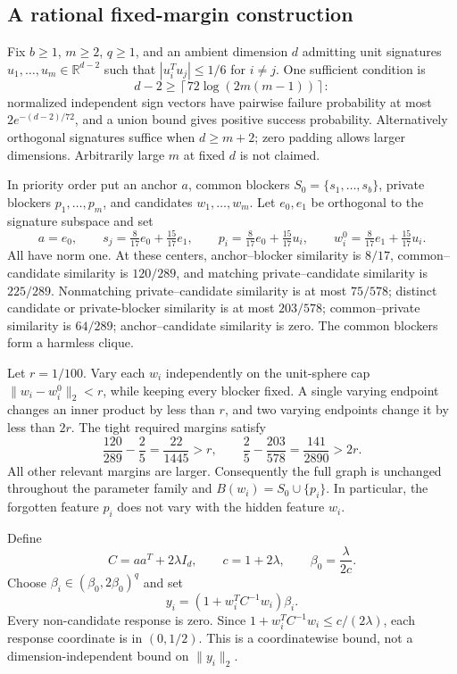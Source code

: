 \subsection{A rational fixed-margin construction}
Fix $b\ge1$, $m\ge2$, $q\ge1$, and an ambient dimension $d$ admitting unit
signatures $u_1,\ldots,u_m\in\mathbb R^{d-2}$ such that
$|u_i^Tu_j|\le1/6$ for $i\ne j$.  One sufficient condition is
\[
 d-2\ge\left\lceil72\log(2m(m-1))\right\rceil:
\]
normalized independent sign vectors have pairwise failure probability at
most $2e^{-(d-2)/72}$, and a union bound gives positive success probability.
Alternatively orthogonal signatures suffice when $d\ge m+2$; zero padding
allows larger dimensions.  Arbitrarily large $m$ at fixed $d$ is not claimed.

In priority order put an anchor $a$, common blockers
$S_0=\{s_1,\ldots,s_b\}$, private blockers $p_1,\ldots,p_m$, and candidates
$w_1,\ldots,w_m$.  Let $e_0,e_1$ be orthogonal to the signature subspace and set
\[
 a=e_0,\qquad
 s_j=\tfrac8{17}e_0+\tfrac{15}{17}e_1,\qquad
 p_i=\tfrac8{17}e_0+\tfrac{15}{17}u_i,\qquad
 w_i^0=\tfrac8{17}e_1+\tfrac{15}{17}u_i.
\]
All have norm one.  At these centers, anchor--blocker similarity is $8/17$,
common--candidate similarity is $120/289$, and matching private--candidate
similarity is $225/289$.  Nonmatching private--candidate similarity is at
most $75/578$; distinct candidate or private-blocker similarity is at most
$203/578$; common--private similarity is $64/289$; anchor--candidate
similarity is zero.  The common blockers form a harmless clique.

Let $r=1/100$.  Vary each $w_i$ independently on the unit-sphere cap
$\|w_i-w_i^0\|_2<r$, while keeping every blocker fixed.  A single varying
endpoint changes an inner product by less than $r$, and two varying
endpoints change it by less than $2r$.  The tight required margins satisfy
\[
 \frac{120}{289}-\frac25=\frac{22}{1445}>r,\qquad
 \frac25-\frac{203}{578}=\frac{141}{2890}>2r.
\]
All other relevant margins are larger.  Consequently the full graph is
unchanged throughout the parameter family and
$B(w_i)=S_0\cup\{p_i\}$.  In particular, the forgotten feature $p_i$ does
not vary with the hidden feature $w_i$.

Define
\[
 C=aa^T+2\lambda I_d,\qquad c=1+2\lambda,\qquad
 \beta_0=\frac\lambda{2c}.
\]
Choose $\beta_i\in(\beta_0,2\beta_0)^q$ and set
\[
 y_i=(1+w_i^TC^{-1}w_i)\beta_i.
\]
Every non-candidate response is zero.  Since
$1+w_i^TC^{-1}w_i\le c/(2\lambda)$, each response coordinate is in
$(0,1/2)$.  This is a coordinatewise bound, not a dimension-independent
bound on $\|y_i\|_2$.

